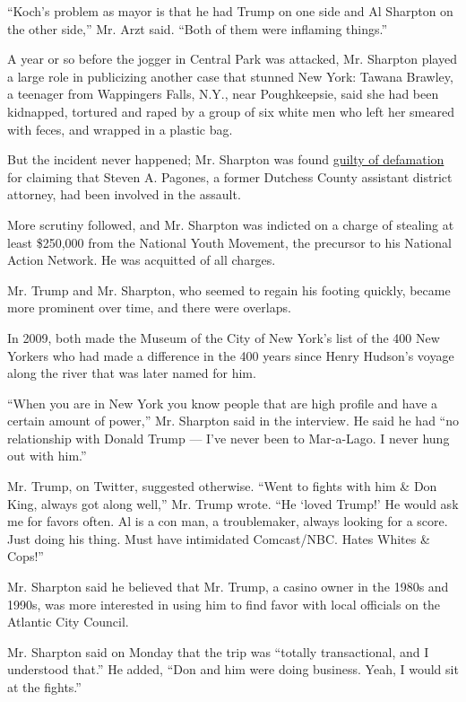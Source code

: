 ``Koch's problem as mayor is that he had Trump on one side and Al
Sharpton on the other side,'' Mr. Arzt said. ``Both of them were
inflaming things.''

A year or so before the jogger in Central Park was attacked, Mr.
Sharpton played a large role in publicizing another case that stunned
New York: Tawana Brawley, a teenager from Wappingers Falls, N.Y., near
Poughkeepsie, said she had been kidnapped, tortured and raped by a group
of six white men who left her smeared with feces, and wrapped in a
plastic bag.

But the incident never happened; Mr. Sharpton was found
\href{https://www.nytimes.com/2001/06/15/nyregion/sharpton-s-debt-in-brawley-defamation-is-paid-by-supporters.html}{guilty
of defamation} for claiming that Steven A. Pagones, a former Dutchess
County assistant district attorney, had been involved in the assault.

More scrutiny followed, and Mr. Sharpton was indicted on a charge of
stealing at least \$250,000 from the National Youth Movement, the
precursor to his National Action Network. He was acquitted of all
charges.

Mr. Trump and Mr. Sharpton, who seemed to regain his footing quickly,
became more prominent over time, and there were overlaps.

In 2009, both made the Museum of the City of New York's list of the 400
New Yorkers who had made a difference in the 400 years since Henry
Hudson's voyage along the river that was later named for him.

``When you are in New York you know people that are high profile and
have a certain amount of power,'' Mr. Sharpton said in the interview. He
said he had ``no relationship with Donald Trump --- I've never been to
Mar-a-Lago. I never hung out with him.''

Mr. Trump, on Twitter, suggested otherwise. ``Went to fights with him \&
Don King, always got along well,'' Mr. Trump wrote. ``He `loved Trump!'
He would ask me for favors often. Al is a con man, a troublemaker,
always looking for a score. Just doing his thing. Must have intimidated
Comcast/NBC. Hates Whites \& Cops!''

Mr. Sharpton said he believed that Mr. Trump, a casino owner in the
1980s and 1990s, was more interested in using him to find favor with
local officials on the Atlantic City Council.

Mr. Sharpton said on Monday that the trip was ``totally transactional,
and I understood that.'' He added, ``Don and him were doing business.
Yeah, I would sit at the fights.''

